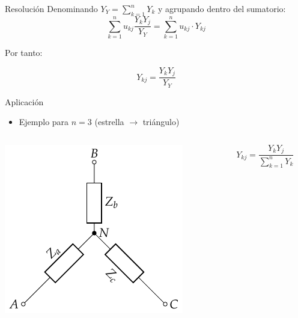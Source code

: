 \documentclass[aspectratio=169, usenames,svgnames,dvipsnames]{beamer}
\begin{document}
\begin{frame}[label={sec:orgbd21c7c}]{Resolución}
Denominando \(Y_Y = \sum_{k  = 1}^n Y_k\) y agrupando dentro del sumatorio:
\[
  \sum_{k = 1}^n u_{kj} \frac{Y_k Y_j}{Y_Y} = \sum_{k = 1}^n u_{kj} \cdot Y_{kj}  
\]

Por tanto:

\[
  \boxed{Y_{kj} = \frac{Y_k Y_j}{Y_Y}}
\]
\end{frame}

\begin{frame}[label={sec:orgbd3489d}]{Aplicación}
\begin{itemize}
\item Ejemplo para \(n = 3\) (estrella \(\rightarrow\) triángulo)
\end{itemize}

\begin{columns}
\begin{column}{0.3\columnwidth}
\begin{center}
\includegraphics[height=0.5\textheight]{../figs/Impedancia_Estrella.pdf}
\end{center}
\end{column}

\begin{column}{0.3\columnwidth}
\[
  \boxed{Y_{kj} = \frac{Y_k Y_j}{\sum_{k  = 1}^n Y_k}}
\]


\end{column}
\end{columns}
\end{frame}
\end{document}
